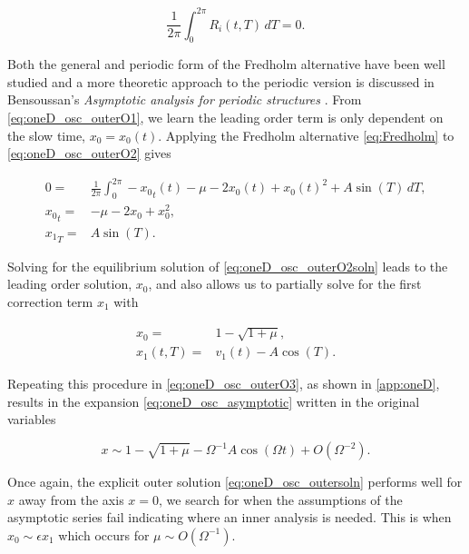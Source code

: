 \begin{equation} \label{eq:Fredholm}
\frac{1}{2\pi}\int_0^{2\pi}R_i(t,T)\,dT=0.
\end{equation}

Both the general and periodic form of the Fredholm alternative have been well studied and a more theoretic approach to the periodic version is discussed in Bensoussan's \textit{Asymptotic analysis for periodic structures} \cite{bensoussan2011asymptotic}. From \eqref{eq:oneD_osc_outerO1}, we learn the leading order term is only dependent on the slow time, $x_0=x_0(t)$. Applying the Fredholm alternative \eqref{eq:Fredholm} to \eqref{eq:oneD_osc_outerO2} gives

\begin{equation}\label{eq:oneD_osc_outerO2soln}
\begin{aligned}
0=&\frac{1}{2\pi}\int_0^{2\pi} -{x_0}_t(t) -\mu -2x_0(t)+x_0(t)^2+A\sin(T)\,dT ,\\
{x_0}_t=& -\mu -2x_0+x_0^2 ,\\
{x_1}_T =& A\sin(T).
\end{aligned}
\end{equation}

Solving for the equilibrium solution of \eqref{eq:oneD_osc_outerO2soln} leads to the leading order solution, $x_0$, and also allows us to partially solve for the first correction term $x_1$ with

\begin{equation*}
\begin{aligned}
x_0 =& 1-\sqrt{1+\mu},\\
x_1(t,T) =& v_1(t) - A\cos(T).
\end{aligned}
\end{equation*}

Repeating this procedure in \eqref{eq:oneD_osc_outerO3}, as shown in \autoref{app:oneD}, results in the expansion \eqref{eq:oneD_osc_asymptotic} written in the original variables

\begin{equation}\label{eq:oneD_osc_outersoln}
x\sim 1-\sqrt{1+\mu}-\Omega^{-1} A \cos(\Omega t)+O(\Omega^{-2}).
\end{equation}

Once again, the explicit outer solution \eqref{eq:oneD_osc_outersoln} performs well for $x$ away from the axis $x=0$, we search for when the assumptions of the asymptotic series fail indicating where an inner analysis is needed. This is when $x_0\sim \epsilon x_1$ which occurs for $\mu\sim O(\Omega^{-1})$.

